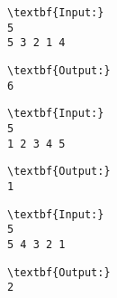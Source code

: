 \begin{verbatim}
\textbf{Input:}
5
5 3 2 1 4\end{verbatim}
\begin{verbatim}
\textbf{Output:}
6\end{verbatim}
\begin{verbatim}
\textbf{Input:}
5
1 2 3 4 5\end{verbatim}
\begin{verbatim}
\textbf{Output:}
1\end{verbatim}
\begin{verbatim}
\textbf{Input:}
5
5 4 3 2 1\end{verbatim}
\begin{verbatim}
\textbf{Output:}
2\end{verbatim}
